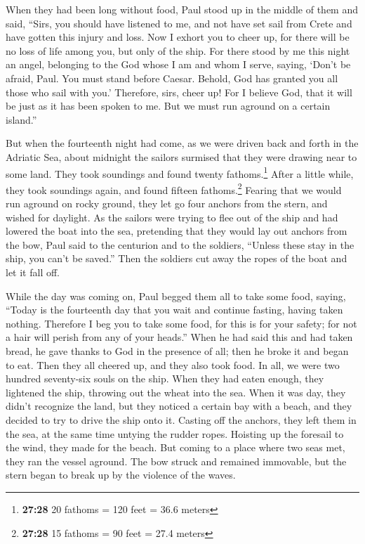  When they had been long without food, Paul stood up in
the middle of them and said, ``Sirs, you should have listened to me, and
not have set sail from Crete and have gotten this injury and loss.
 Now I exhort you to cheer up, for there will be no loss
of life among you, but only of the ship.  For there stood
by me this night an angel, belonging to the God whose I am and whom I
serve,  saying, `Don't be afraid, Paul. You must stand
before Caesar. Behold, God has granted you all those who sail with you.'
 Therefore, sirs, cheer up! For I believe God, that it
will be just as it has been spoken to me.  But we must
run aground on a certain island.''

 But when the fourteenth night had come, as we were
driven back and forth in the Adriatic Sea, about midnight the sailors
surmised that they were drawing near to some land.  They
took soundings and found twenty fathoms.\footnote{\textbf{27:28} 20
  fathoms = 120 feet = 36.6 meters} After a little while, they took
soundings again, and found fifteen fathoms.\footnote{\textbf{27:28} 15
  fathoms = 90 feet = 27.4 meters}  Fearing that we would
run aground on rocky ground, they let go four anchors from the stern,
and wished for daylight.  As the sailors were trying to
flee out of the ship and had lowered the boat into the sea, pretending
that they would lay out anchors from the bow,  Paul said
to the centurion and to the soldiers, ``Unless these stay in the ship,
you can't be saved.''  Then the soldiers cut away the
ropes of the boat and let it fall off.

 While the day was coming on, Paul begged them all to
take some food, saying, ``Today is the fourteenth day that you wait and
continue fasting, having taken nothing.  Therefore I beg
you to take some food, for this is for your safety; for not a hair will
perish from any of your heads.''  When he had said this
and had taken bread, he gave thanks to God in the presence of all; then
he broke it and began to eat.  Then they all cheered up,
and they also took food.  In all, we were two hundred
seventy-six souls on the ship.  When they had eaten
enough, they lightened the ship, throwing out the wheat into the sea.
 When it was day, they didn't recognize the land, but
they noticed a certain bay with a beach, and they decided to try to
drive the ship onto it.  Casting off the anchors, they
left them in the sea, at the same time untying the rudder ropes.
Hoisting up the foresail to the wind, they made for the beach.
 But coming to a place where two seas met, they ran the
vessel aground. The bow struck and remained immovable, but the stern
began to break up by the violence of the waves.

